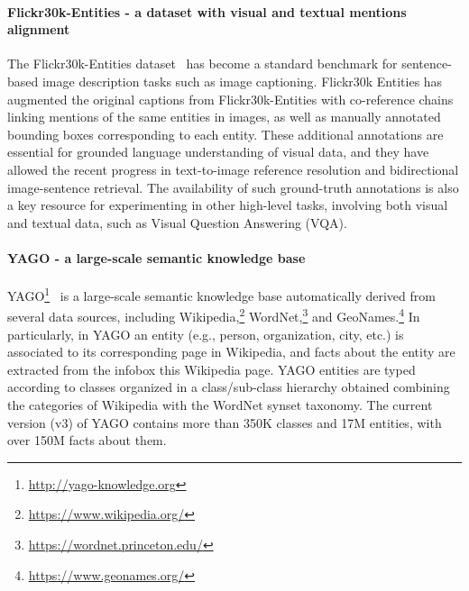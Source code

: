\documentclass[11pt,a4paper]{article}
\begin{document}
\paragraph{Flickr30k-Entities - a dataset with visual and textual mentions
	alignment} The Flickr30k-Entities dataset~\cite{plummer2015flickr30k} has
become a standard benchmark for sentence-based image description tasks
such as image captioning. Flickr30k Entities has augmented the
original captions from Flickr30k-Entities with co-reference chains linking
mentions of the same entities in images, as well as manually annotated
bounding boxes corresponding to each entity. These additional
annotations are essential for grounded language understanding of
visual data, and they have allowed the recent progress in
text-to-image reference resolution and bidirectional image-sentence
retrieval. The availability of such ground-truth annotations is also a
key resource for experimenting in other high-level tasks, involving
both visual and textual data, such as Visual Question Answering (VQA).

\paragraph{YAGO - a large-scale semantic knowledge base}
YAGO\footnote{\url{http://yago-knowledge.org}}~\cite{yago} is a
large-scale semantic knowledge base automatically derived from several
data sources, including
Wikipedia,\footnote{\url{https://www.wikipedia.org/}}
WordNet,\footnote{\url{https://wordnet.princeton.edu/}} and
GeoNames.\footnote{\url{https://www.geonames.org/}} In particularly,
in YAGO an entity (e.g., person, organization, city, etc.) is
associated to its corresponding page in Wikipedia, and facts about the entity are
extracted from the infobox this Wikipedia page.
YAGO entities are typed according to classes organized in a class/sub-class
hierarchy obtained combining the categories of Wikipedia with the
WordNet synset taxonomy. The current version (v3) of YAGO contains
more than 350K classes and 17M entities, with over 150M facts about
them.
\end{document}
